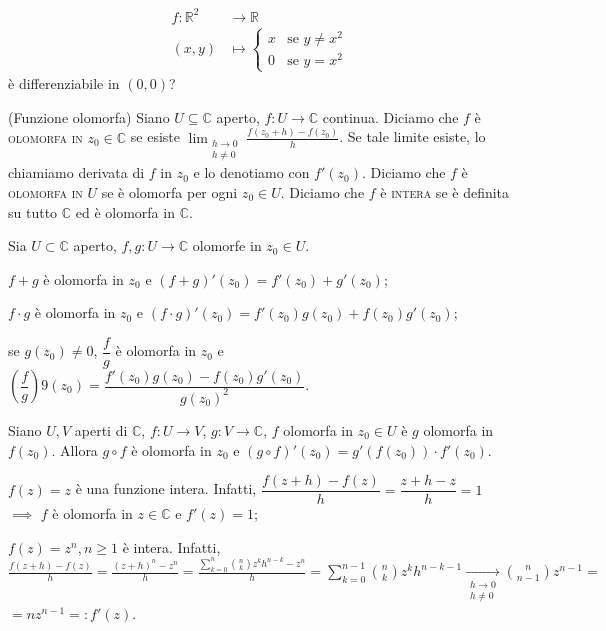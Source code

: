 \begin{exc}
  \begin{align*}
    f:\mathbb{R}^2 &\longrightarrow \mathbb{R}\\
    (x, y) &\longmapsto \begin{cases} x & \mbox{se }y\not=x^2 \\ 0 & \mbox{se }y=x^2 \end{cases}
  \end{align*}
  è differenziabile in $(0, 0)$?
\end{exc}

\begin{defn}
  (Funzione olomorfa) Siano $U \subseteq \mathbb{C}$ aperto, $f:U \longrightarrow \mathbb{C}$ continua. Diciamo che $f$ è \textsc{olomorfa in $z_0 \in \mathbb{C}$} se esiste $\displaystyle \lim_{\substack{h \longrightarrow 0 \\ h\not=0}} \frac{f(z_0+h)-f(z_0)}{h}$. Se tale limite esiste, lo chiamiamo derivata di $f$ in $z_0$ e lo denotiamo con $f'(z_0)$.
  Diciamo che $f$ è \textsc{olomorfa in $U$} se è olomorfa per ogni $z_0 \in U$. Diciamo che $f$ è \textsc{intera} se è definita su tutto $\mathbb{C}$ ed è olomorfa in $\mathbb{C}$.
\end{defn}

\begin{prop}
  Sia $U \subset \mathbb{C}$ aperto, $f, g:U \longrightarrow \mathbb{C}$ olomorfe in $z_0 \in U$.
  \begin{nlist}
    \item $f+g$ è olomorfa in $z_0$ e $(f+g)'(z_0)=f'(z_0)+g'(z_0)$;
    \item $f \cdot g$ è olomorfa in $z_0$ e $(f \cdot g)'(z_0)=f'(z_0)g(z_0)+f(z_0)g'(z_0)$;
    \item se $g(z_0) \not=0$, $\dfrac{f}{g}$ è olomorfa in $z_0$ e $\left(\dfrac{f}{g}\right)9(z_0)=\dfrac{f'(z_0)g(z_0)-f(z_0)g'(z_0)}{g(z_0)^2}$.
  \end{nlist}
\end{prop}

\begin{prop}
  Siano $U, V$ aperti di $\mathbb{C}$, $f:U \longrightarrow V$, $g:V \longrightarrow \mathbb{C}$, $f$ olomorfa in $z_0 \in U$ è $g$ olomorfa in $f(z_0)$. Allora $g \circ f$ è olomorfa in $z_0$ e $(g \circ f)'(z_0)=g'(f(z_0))\cdot f'(z_0)$.
\end{prop}

\begin{ex}
  \begin{nlist}
    \item $f(z)=z$ è una funzione intera. Infatti, $\dfrac{f(z+h)-f(z)}{h}=\dfrac{z+h-z}{h}=1$ $\implies$ $f$ è olomorfa in $z \in \mathbb{C}$ e $f'(z)=1$;
    \item $f(z)=z^n, n \ge 1$ è intera.
    Infatti, $\displaystyle \frac{f(z+h)-f(z)}{h}=\frac{(z+h)^n-z^n}{h}=\frac{\sum_{k=0}^n \binom{n}{k}z^kh^{n-k}-z^n}{h}=\sum_{k=0}^{n-1} \binom{n}{k}z^kh^{n-k-1} \xrightarrow[\substack{h \longrightarrow 0 \\ h\not=0}]{} \binom{n}{n-1} z^{n-1}=$\\
    $=nz^{n-1}=:f'(z)$.
  \end{nlist}
\end{ex}

